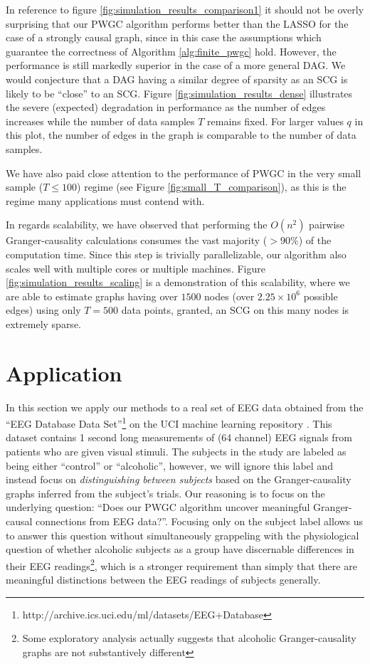 \documentclass[12pt]{article}
\begin{document}
In reference to figure \ref{fig:simulation_results_comparison1} it
should not be overly surprising that our PWGC algorithm performs
better than the LASSO for the case of a strongly causal graph, since
in this case the assumptions which guarantee the correctness of
Algorithm \ref{alg:finite_pwgc} hold.  However, the performance is
still markedly superior in the case of a more general DAG.  We would
conjecture that a DAG having a similar degree of sparsity as an SCG is
likely to be ``close'' to an SCG.  Figure
\ref{fig:simulation_results_dense} illustrates the severe (expected)
degradation in performance as the number of edges increases while
the number of data samples $T$ remains fixed.  For larger values $q$
in this plot, the number of edges in the graph is comparable to the
number of data samples.

We have also paid close attention to the performance of PWGC in the
very small sample ($T \le 100$) regime (see Figure
\ref{fig:small_T_comparison}), as this is the regime many applications
must contend with.

In regards scalability, we have observed that performing the $O(n^2)$
pairwise Granger-causality calculations consumes the vast majority
($> 90\%$) of the computation time.  Since this step is trivially
parallelizable, our algorithm also scales well with multiple cores or
multiple machines.  Figure \ref{fig:simulation_results_scaling} is a
demonstration of this scalability, where we are able to estimate
graphs having over $1500$ nodes (over $2.25 \times 10 ^6$ possible edges)
using only $T = 500$ data points, granted, an SCG on this many nodes
is extremely sparse.

\section{Application}
\label{sec:application}
In this section we apply our methods to a real set of EEG data
obtained from the ``EEG Database Data
Set''\footnote{http://archive.ics.uci.edu/ml/datasets/EEG+Database}
\cite{zhang1995event} on the UCI machine learning repository
\cite{uci_mlr}.  This dataset contains 1 second long measurements of
(64 channel) EEG signals from patients who are given visual stimuli.
The subjects in the study are labeled as being either ``control'' or
``alcoholic'', however, we will ignore this label and instead focus on
\textit{distinguishing between subjects} based on the
Granger-causality graphs inferred from the subject's trials.  Our
reasoning is to focus on the underlying question: ``Does our PWGC
algorithm uncover meaningful Granger-causal connections from EEG
data?''.  Focusing only on the subject label allows us to answer this
question without simultaneously grappeling with the physiological
question of whether alcoholic subjects as a group have discernable
differences in their EEG readings\footnote{Some exploratory analysis
  actually suggests that alcoholic Granger-causality graphs are not
  substantively different}, which is a stronger requirement than
simply that there are meaningful distinctions between the EEG readings
of subjects generally.
\end{document}
